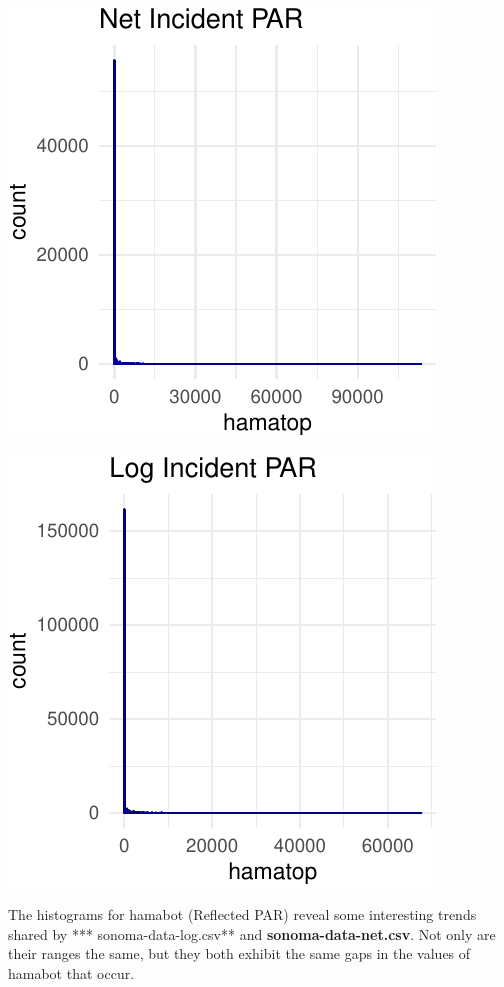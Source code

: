 \documentclass[]{article}
\begin{document}
\begin{center}\includegraphics{Project1WriteUp_files/figure-latex/unnamed-chunk-2-1} \end{center}

\begin{center}\includegraphics{Project1WriteUp_files/figure-latex/unnamed-chunk-2-2} \end{center}

The histograms for hamabot (Reflected PAR) reveal some interesting
trends shared by *** sonoma-data-log.csv** and
\textbf{sonoma-data-net.csv}. Not only are their ranges the same, but
they both exhibit the same gaps in the values of hamabot that occur.
\end{document}
